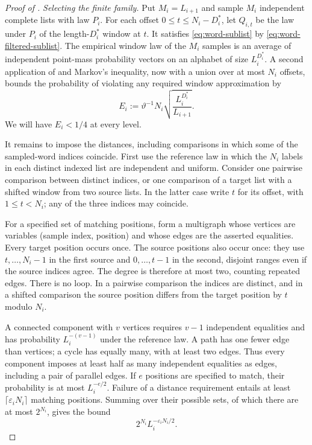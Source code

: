\begin{proof}[Proof of ]
\smallskip\noindent
\emph{Selecting the finite family.}
Put $M_i=L_{i+1}$ and sample $M_i$ independent complete lists with law
$P_i$.  For each offset $0\le t\le N_i-D_i^*$, let $Q_{i,t}$ be the
law under $P_i$ of the length-$D_i^*$ window at $t$.
It satisfies \eqref{eq:word-sublist} by
\eqref{eq:word-filtered-sublist}.
The empirical window law of the $M_i$ samples is an average of
independent point-mass probability vectors on an alphabet of size
$L_i^{D_i^*}$.  A second application of  and Markov's
inequality, now with a union over at most $N_i$ offsets, bounds the
probability of violating any required window approximation by
\begin{equation}\label{eq:word-window-budget}
  E_i:=\vartheta^{-1}N_i
        \sqrt{\frac{L_i^{D_i^*}}{L_{i+1}}}.
\end{equation}
We will have $E_i<1/4$ at every level.

It remains to impose the distances, including comparisons in which
some of the sampled-word indices coincide.  First use the reference
law in which the $N_i$ labels in each distinct indexed list are
independent and uniform.  Consider one pairwise comparison between
distinct indices, or one comparison of a target list with a shifted
window from two source lists.  In the latter case write $t$ for its
offset, with $1\le t<N_i$; any of the three indices may coincide.

For a specified set of matching positions, form a multigraph whose
vertices are variables (sample index, position) and whose edges are
the asserted equalities.  Every target position occurs once.  The
source positions also occur once: they use $t,\ldots,N_i-1$ in the
first source and $0,\ldots,t-1$ in the second, disjoint ranges even if
the source indices agree.  The degree is therefore at most two,
counting repeated edges.  There is no loop.  In a pairwise comparison
the indices are distinct, and in a shifted comparison the source
position differs from the target position by $t$ modulo $N_i$.

A connected component with $v$ vertices requires $v-1$ independent
equalities and has probability $L_i^{-(v-1)}$ under the reference law.
A path has one fewer edge than vertices; a cycle has equally many,
with at least two edges.  Thus every component imposes at least half
as many independent equalities as edges, including a pair of parallel
edges.  If $e$ positions are specified to match, their probability is
at most $L_i^{-e/2}$.
Failure of a distance requirement entails at least
$\lceil\varepsilon_iN_i\rceil$ matching positions.  Summing over their
possible sets, of which there are at most $2^{N_i}$, gives the bound
\begin{equation}\label{eq:word-reference-distance}
  2^{N_i}L_i^{-\varepsilon_iN_i/2}.
\end{equation}


\end{proof}
